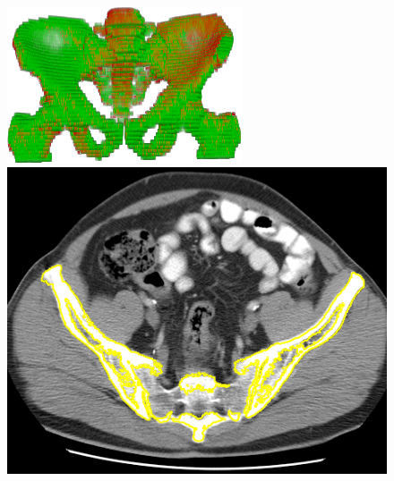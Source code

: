\documentclass[10pt, a4paper]{article}
\begin{document}
{\begin{enumerate}
\begin{figure}[]
%
\begin{minipage}[b]{.42\linewidth}
  \centering
\centerline{\includegraphics[width=\linewidth]{figures/research/cd03_0003_overlay_3d_gc}}
\vspace{1mm}
\end{minipage}
\hfill
\begin{minipage}[b]{0.42\linewidth}
  \centering
  \centerline{\includegraphics[width=\linewidth]{figures/research/d03_0003_Reg_Overlay_0015_cut}}
\vspace{1mm}
\end{minipage}\\
\begin{minipage}[b]{.42\linewidth}
  \centering

\end{minipage}
\end{figure}
\end{enumerate}}
\end{document}
